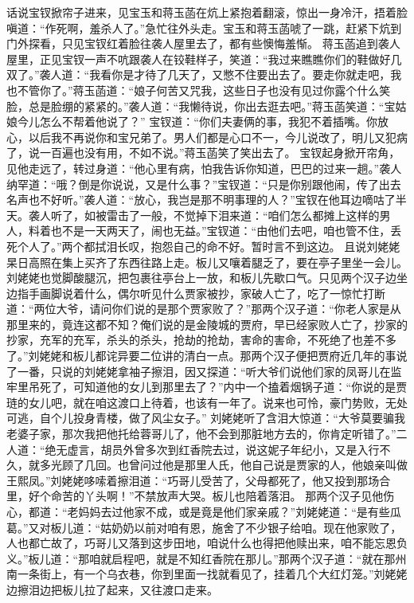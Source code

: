 \documentclass[12pt,oneside]{book}
\begin{document}
话说宝钗掀帘子进来，见宝玉和蒋玉菡在炕上紧抱着翻滚，惊出一身冷汗，捂着脸嗔道：“作死啊，羞杀人了。”急忙往外头走。宝玉和蒋玉菡唬了一跳，赶紧下炕到门外探看，只见宝钗红着脸往袭人屋里去了，都有些懊悔羞惭。
蒋玉菡追到袭人屋里，正见宝钗一声不吭跟袭人在铰鞋样子，笑道：“我过来瞧瞧你们的鞋做好几双了。”袭人道：“我看你是才待了几天了，又憋不住要出去了。要走你就走吧，我也不管你了。”蒋玉菡道：“娘子何苦又咒我，这些日子也没有见过你露个什么笑脸，总是脸绷的紧紧的。”袭人道：“我懒待说，你出去逛去吧。”蒋玉菡笑道：“宝姑娘今儿怎么不帮着他说了？”
宝钗道：“你们夫妻俩的事，我犯不着插嘴。你放心，以后我不再说你和宝兄弟了。男人们都是心口不一，今儿说改了，明儿又犯病了，说一百遍也没有用，不如不说。”蒋玉菡笑了笑出去了。
宝钗起身掀开帘角，见他走远了，转过身道：“他心里有病，怕我告诉你知道，巴巴的过来一趟。”袭人纳罕道：“哦？倒是你说说，又是什么事？”宝钗道：“只是你别跟他闹，传了出去名声也不好听。”袭人道：“放心，我岂是那不明事理的人？”宝钗在他耳边嘀咕了半天。袭人听了，如被雷击了一般，不觉掉下泪来道：“咱们怎么都摊上这样的男人，料着也不是一天两天了，闹也无益。”宝钗道：“由他们去吧，咱也管不住，丢死个人了。”两个都拭泪长叹，抱怨自己的命不好。暂时言不到这边。
且说刘姥姥杲日高照在集上买齐了东西往路上走。板儿又嚷着腿乏了，要在亭子里坐一会儿。刘姥姥也觉脚酸腿沉，把包裹往亭台上一放，和板儿先歇口气。只见两个汉子边坐边指手画脚说着什么，偶尔听见什么贾家被抄，家破人亡了，吃了一惊忙打断道：“两位大爷，请问你们说的是那个贾家败了？”那两个汉子道：“你老人家是从那里来的，竟连这都不知？俺们说的是金陵城的贾府，早已经家败人亡了，抄家的抄家，充军的充军，杀头的杀头，抢劫的抢劫，害命的害命，不死绝了也差不多了。”刘姥姥和板儿都诧异要二位讲的清白一点。那两个汉子便把贾府近几年的事说了一番，只说的刘姥姥拿袖子擦泪，因又探道：“听大爷们说他们家的凤哥儿在监牢里吊死了，可知道他的女儿到那里去了？”内中一个搕着烟锅子道：“你说的是贾琏的女儿吧，就在咱这渡口上待着，也该有一年了。说来也可怜，豪门势败，无处可逃，自个儿投身青楼，做了风尘女子。”
刘姥姥听了含泪大惊道：“大爷莫要骗我老婆子家，那次我把他托给蓉哥儿了，他不会到那脏地方去的，你肯定听错了。”二人道：“绝无虚言，胡员外曾多次到红香院去过，说这妮子年纪小，又是入行不久，就多光顾了几回。也曾问过他是那里人氏，他自己说是贾家的人，他娘亲叫做王熙凤。”刘姥姥哆嗦着擦泪道：“巧哥儿受苦了，父母都死了，他又投到那场合里，好个命苦的丫头啊！”不禁放声大哭。板儿也陪着落泪。
那两个汉子见他伤心，都道：“老妈妈去过他家不成，或是竟是他们家亲戚？”刘姥姥道：“是有些瓜葛。”又对板儿道：“姑奶奶以前对咱有恩，施舍了不少银子给咱。现在他家败了，人也都亡故了，巧哥儿又落到这步田地，咱说什么也得把他赎出来，咱不能忘恩负义。”板儿道：“那咱就启程吧，就是不知红香院在那儿。”那两个汉子道：“就在那州南一条街上，有一个乌衣巷，你到里面一找就看见了，挂着几个大红灯笼。”刘姥姥边擦泪边把板儿拉了起来，又往渡口走来。
\end{document}
